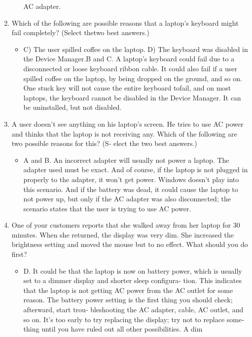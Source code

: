 \documentclass{article}
\begin{document}
\begin{enumerate}
\begin{itemize}
AC adapter.
     \end{itemize}
     \item Which of the following are possible reasons that a laptop’s
keyboard might fail completely? (Select thetwo best answers.)
     \begin{itemize}
         \item C) The user spilled coffee on the laptop. D) The keyboard was disabled in the Device Manager.B and C. A laptop’s keyboard could fail due to a disconnected
or loose keyboard ribbon cable. It could also fail if a user
spilled coffee on the laptop, by being dropped on the ground,
and so on. One stuck key will not cause the entire keyboard tofail, and on most laptops, the keyboard cannot be disabled in
the Device Manager. It can be uninstalled, but not disabled.
     \end{itemize}
     \item A user doesn’t see anything on his laptop’s screen. He tries to
use AC power and thinks that the laptop is not receiving any.
Which of the following are two possible reasons for this? (S‐
elect the two best answers.)
     \begin{itemize}
         \item A and B. An incorrect adapter will usually not power a laptop.
The adapter used must be exact. And of course, if the laptop is
not plugged in properly to the adapter, it won’t get power.
Windows doesn’t play into this scenario. And if the battery
was dead, it could cause the laptop to not power up, but only if
the AC adapter was also disconnected; the scenario states that
the user is trying to use AC power.
     \end{itemize}
     \item One of your customers reports that she walked away from her
laptop for 30 minutes. When she returned, the display was very
dim. She increased the brightness setting and moved the mouse
but to no effect. What should you do first?
     \begin{itemize}
         \item D. It could be that the laptop is now on battery power, which is
usually set to a dimmer display and shorter sleep configura‐
tion. This indicates that the laptop is not getting AC power
from the AC outlet for some reason. The battery power setting
is the first thing you should check; afterward, start trou‐
bleshooting the AC adapter, cable, AC outlet, and so on. It’s
too early to try replacing the display; try not to replace some‐
thing until you have ruled out all other possibilities. A dim

\end{itemize}
\end{enumerate}
\end{document}
